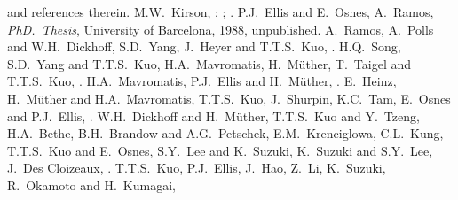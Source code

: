 \begin{thebibliography}{200}
and references therein.
 M.W.\ Kirson, 
;
;
.
P.J.\ Ellis and E.\ Osnes, 
A.\ Ramos, {\em PhD.\ Thesis}, University of Barcelona, 1988, unpublished.
A.\ Ramos, A.\ Polls and W.H.\ Dickhoff, 
S.D.\ Yang, J.\ Heyer and T.T.S.\ Kuo, 
.
H.Q.\ Song, S.D.\ Yang and T.T.S.\ Kuo,
H.A.\ Mavromatis, H.\ M\"{u}ther, T.\ Taigel and T.T.S.\ Kuo, 
.
H.A.\ Mavromatis, P.J.\ Ellis and H.\ M\"{u}ther, 
.
 E.\ Heinz, H.\ M\"{u}ther and H.A.\ Mavromatis, 
 T.T.S.\ Kuo, J.\ Shurpin, K.C.\ Tam, E.\ Osnes and P.J.\ Ellis, 
.
W.H.\ Dickhoff and H.\ M\"{u}ther, 
T.T.S.\ Kuo and Y.\ Tzeng, 
H.A.\ Bethe, B.H.\ Brandow and A.G.\ Petschek,
E.M.\ Krenciglowa, C.L.\ Kung, T.T.S.\ Kuo and E.\ Osnes, 
S.Y.\ Lee and K.\ Suzuki, 
K.\ Suzuki and S.Y.\ Lee, 
J.\ Des Cloizeaux, 
.
T.T.S.\ Kuo, P.J.\ Ellis, J.\ Hao, Z.\ Li, K.\ Suzuki, 
R.\ Okamoto and H.\ Kumagai,

\end{thebibliography}
